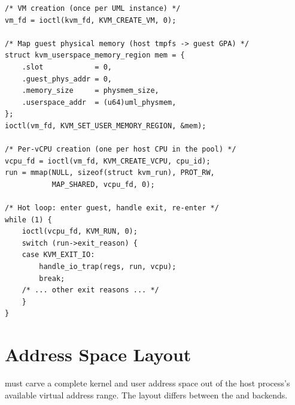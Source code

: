 \begin{lstlisting}[language=KernelC,caption={KVM ioctl sequence for
UML's v2 backend.},label=lst:kvm-ioctls]
/* VM creation (once per UML instance) */
vm_fd = ioctl(kvm_fd, KVM_CREATE_VM, 0);

/* Map guest physical memory (host tmpfs -> guest GPA) */
struct kvm_userspace_memory_region mem = {
    .slot            = 0,
    .guest_phys_addr = 0,
    .memory_size     = physmem_size,
    .userspace_addr  = (u64)uml_physmem,
};
ioctl(vm_fd, KVM_SET_USER_MEMORY_REGION, &mem);

/* Per-vCPU creation (one per host CPU in the pool) */
vcpu_fd = ioctl(vm_fd, KVM_CREATE_VCPU, cpu_id);
run = mmap(NULL, sizeof(struct kvm_run), PROT_RW,
           MAP_SHARED, vcpu_fd, 0);

/* Hot loop: enter guest, handle exit, re-enter */
while (1) {
    ioctl(vcpu_fd, KVM_RUN, 0);
    switch (run->exit_reason) {
    case KVM_EXIT_IO:
        handle_io_trap(regs, run, vcpu);
        break;
    /* ... other exit reasons ... */
    }
}
\end{lstlisting}


\section{Address Space Layout}
\label{sec:foundations:address-space}

\UML{} must carve a complete kernel and user address space out of the
host process's available virtual address range.  The layout differs
between the \Seccomp{} and \KVM{} backends.

